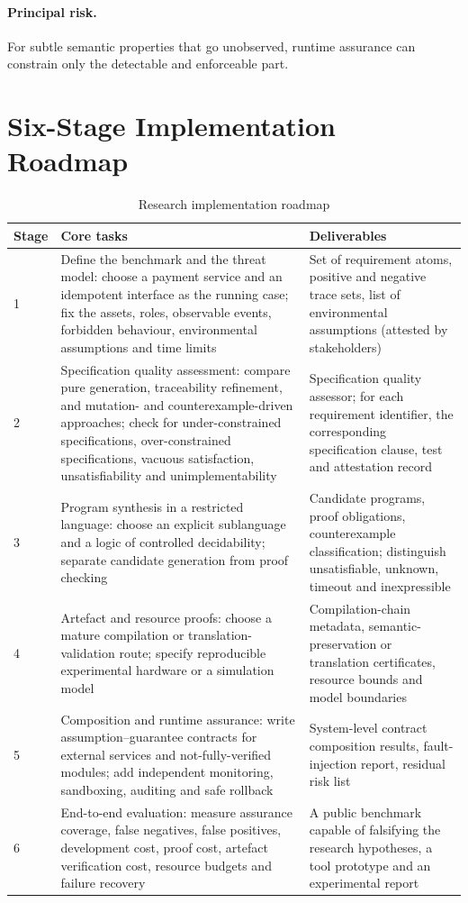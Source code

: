 \paragraph{Principal risk.}
For subtle semantic properties that go unobserved, runtime assurance can constrain only the
detectable and enforceable part.

\section{Six-Stage Implementation Roadmap}

\begin{table}[htbp]
\centering
\small
\caption{Research implementation roadmap}\label{tab:roadmap}
\begin{tabular}{L{1.0cm}L{6.3cm}L{7.0cm}}
\toprule
\textbf{Stage} & \textbf{Core tasks} & \textbf{Deliverables} \\
 & Define the benchmark and the threat model: choose a payment service and an idempotent
  interface as the running case; fix the assets, roles, observable events, forbidden
  behaviour, environmental assumptions and time limits &
  Set of requirement atoms, positive and negative trace sets, list of environmental
  assumptions (attested by stakeholders) \\
2 & Specification quality assessment: compare pure generation, traceability refinement, and
  mutation- and counterexample-driven approaches; check for under-constrained
  specifications, over-constrained specifications, vacuous satisfaction, unsatisfiability
  and unimplementability &
  Specification quality assessor; for each requirement identifier, the corresponding
  specification clause, test and attestation record \\
3 & Program synthesis in a restricted language: choose an explicit sublanguage and a logic
  of controlled decidability; separate candidate generation from proof checking &
  Candidate programs, proof obligations, counterexample classification; distinguish
  unsatisfiable, unknown, timeout and inexpressible \\
4 & Artefact and resource proofs: choose a mature compilation or translation-validation
  route; specify reproducible experimental hardware or a simulation model &
  Compilation-chain metadata, semantic-preservation or translation certificates, resource
  bounds and model boundaries \\
5 & Composition and runtime assurance: write assumption--guarantee contracts for external
  services and not-fully-verified modules; add independent monitoring, sandboxing, auditing
  and safe rollback &
  System-level contract composition results, fault-injection report, residual risk list \\
6 & End-to-end evaluation: measure assurance coverage, false negatives, false positives,
  development cost, proof cost, artefact verification cost, resource budgets and failure
  recovery &
  A public benchmark capable of falsifying the research hypotheses, a tool prototype and an
  experimental report \\
\bottomrule
\end{tabular}
\end{table}

